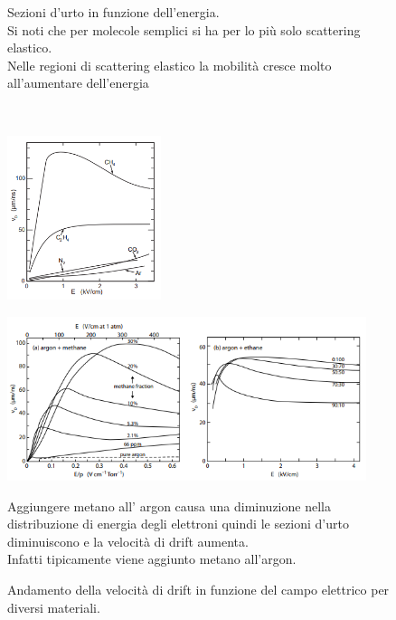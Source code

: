   \begin{figure}[H]
    \centering
    \captionsetup{width=0.95\linewidth}
    \caption{Sezioni d'urto in funzione dell'energia.\\ Si noti che per molecole semplici si ha per lo più solo scattering elastico.\\ Nelle regioni di scattering elastico la mobilità cresce molto all'aumentare dell'energia}
    \label{fig:gascross}
  \end{figure}




 \vspace{-20pt}
  \begin{remark}  \hfill \\ 
\hspace{-50pt}
  \begin{minipage}{0.32\textwidth}
    \begin{figure}[H]
        \centering
        \includegraphics[height=4.8cm,frame]{Chapters/images/Interazione_radiazione_materia/image-20220222172819847.png}
    \end{figure}
  \end{minipage} \hspace{-10pt}
  \begin{minipage}{0.64\textwidth}
  \begin{figure}[H]
    \centering
    \includegraphics[height=4.8cm,frame]{Chapters/images/Interazione_radiazione_materia/image-20220222172607946.png}
  \end{figure}

  \end{minipage}
\begin{figure}[H]
    \captionsetup{width=\textwidth}
    \caption{Andamento della velocità di drift in funzione del campo elettrico per diversi materiali.}
    Aggiungere metano all' argon causa una diminuzione nella distribuzione di energia degli elettroni quindi le sezioni d'urto diminuiscono e la velocità di drift aumenta.\\ 
    Infatti tipicamente viene aggiunto metano all'argon.
\end{figure}

  \end{remark}
